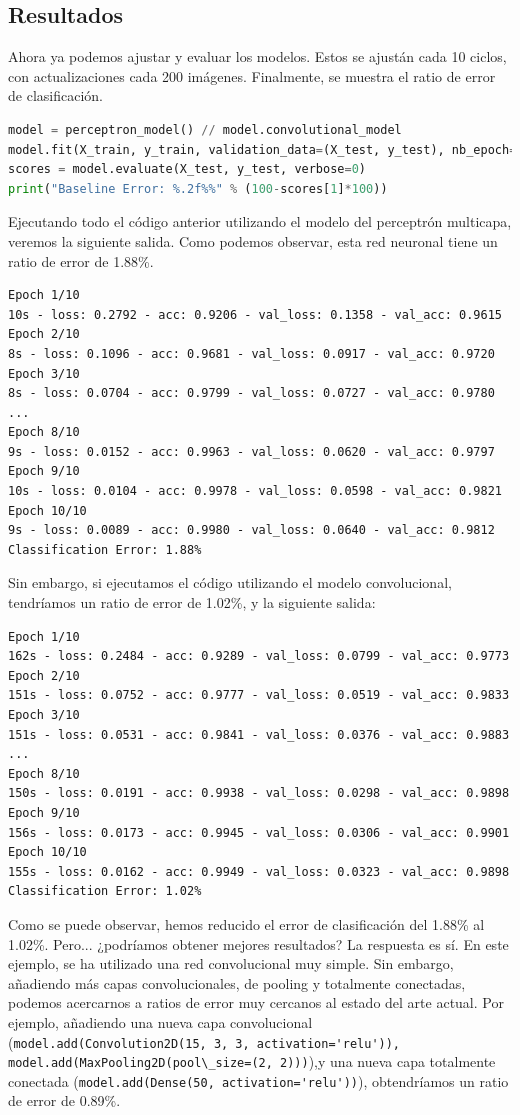 \subsection{Resultados}
Ahora ya podemos ajustar y evaluar los modelos. Estos se ajustán cada 10 ciclos, con actualizaciones cada 200 imágenes. Finalmente, se muestra el ratio de error de clasificación.
\begin{lstlisting}[language=Python]
model = perceptron_model() // model.convolutional_model
model.fit(X_train, y_train, validation_data=(X_test, y_test), nb_epoch=10, batch_size=200, verbose=2)
scores = model.evaluate(X_test, y_test, verbose=0)
print("Baseline Error: %.2f%%" % (100-scores[1]*100))
\end{lstlisting}
Ejecutando todo el código anterior utilizando el modelo del perceptrón multicapa, veremos la siguiente salida. Como podemos observar, esta red neuronal tiene un ratio de error de 1.88\%.
\begin{lstlisting}
Epoch 1/10
10s - loss: 0.2792 - acc: 0.9206 - val_loss: 0.1358 - val_acc: 0.9615
Epoch 2/10
8s - loss: 0.1096 - acc: 0.9681 - val_loss: 0.0917 - val_acc: 0.9720
Epoch 3/10
8s - loss: 0.0704 - acc: 0.9799 - val_loss: 0.0727 - val_acc: 0.9780
...
Epoch 8/10
9s - loss: 0.0152 - acc: 0.9963 - val_loss: 0.0620 - val_acc: 0.9797
Epoch 9/10
10s - loss: 0.0104 - acc: 0.9978 - val_loss: 0.0598 - val_acc: 0.9821
Epoch 10/10
9s - loss: 0.0089 - acc: 0.9980 - val_loss: 0.0640 - val_acc: 0.9812
Classification Error: 1.88%

\end{lstlisting}
Sin embargo, si ejecutamos el código utilizando el modelo convolucional, tendríamos un ratio de error de 1.02\%, y la siguiente salida:
\begin{lstlisting}
Epoch 1/10
162s - loss: 0.2484 - acc: 0.9289 - val_loss: 0.0799 - val_acc: 0.9773
Epoch 2/10
151s - loss: 0.0752 - acc: 0.9777 - val_loss: 0.0519 - val_acc: 0.9833
Epoch 3/10
151s - loss: 0.0531 - acc: 0.9841 - val_loss: 0.0376 - val_acc: 0.9883
...
Epoch 8/10
150s - loss: 0.0191 - acc: 0.9938 - val_loss: 0.0298 - val_acc: 0.9898
Epoch 9/10
156s - loss: 0.0173 - acc: 0.9945 - val_loss: 0.0306 - val_acc: 0.9901
Epoch 10/10
155s - loss: 0.0162 - acc: 0.9949 - val_loss: 0.0323 - val_acc: 0.9898
Classification Error: 1.02%
\end{lstlisting}
Como se puede observar, hemos reducido el error de clasificación del 1.88\% al 1.02\%. Pero... ¿podríamos obtener mejores resultados? La respuesta es sí. En este ejemplo, se ha utilizado una red convolucional muy simple. Sin embargo, añadiendo más capas convolucionales, de pooling y totalmente conectadas, podemos acercarnos a ratios de error muy cercanos al estado del arte actual. Por ejemplo, añadiendo una nueva capa convolucional (\lstinline{model.add(Convolution2D(15, 3, 3, activation='relu')), model.add(MaxPooling2D(pool\_size=(2, 2)))}),y una nueva capa totalmente conectada (\lstinline{model.add(Dense(50, activation='relu'))}), obtendríamos un ratio de error de  0.89\%.


